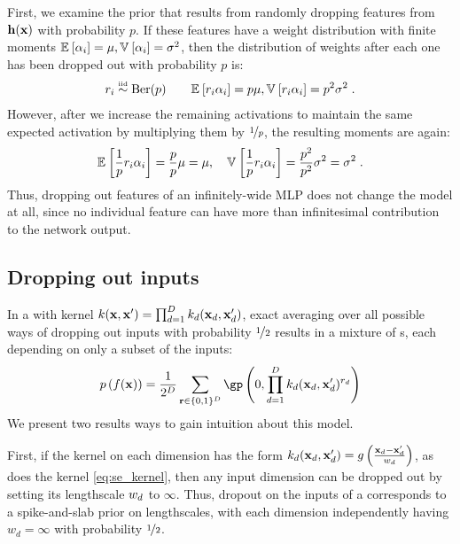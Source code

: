 First, we examine the prior that results from randomly dropping features from ${\bf{h}}({\bf{x}})$ with probability $p$.
If these features have a weight distribution with finite moments
$\mathbb{E}_{} \left[ { \alpha_i} \right] = \mu, \mathbb{V}_{} \left[ {\alpha_i} \right] = \sigma^2$,
then the distribution of weights after each one has been dropped out with probability $p$ is:
\begin{align}
r_i \overset{\mbox{\tiny iid}}{\sim} \textnormal{Ber}(p)
\qquad
\mathbb{E}_{} \left[ { r_i \alpha_i} \right] = p\mu, \mathbb{V}_{} \left[ {r_i \alpha_i} \right] = p^2 \sigma^2 \;.
\end{align}
However, after we increase the remaining activations to maintain the same expected activation by multiplying them by $\nicefrac{1}{p}$, the resulting moments are again:
\begin{align}
\mathbb{E}_{} \left[ { \frac{1}{p} r_i \alpha_i } \right] = \frac{p}{p}\mu = \mu, \quad \mathbb{V}_{} \left[ { \frac{1}{p} r_i \alpha_i} \right] = \frac{p^2}{p^2} \sigma^2 = \sigma^2 \;.
\end{align}
Thus, dropping out features of an infinitely-wide MLP does not change the model at all, since no individual feature can have more than infinitesimal contribution to the network output.

\subsection{Dropping out inputs}

In a \gp{} with kernel ${k({\bf{x}}, {\bf{x}}') = \prod_{d=1}^D k_d({\bf{x}}_d, {\bf{x}}_d')}$, exact averaging over all possible ways of dropping out inputs with probability $\nicefrac{1}{2}$ results in a mixture of \gp{}s, each depending on only a subset of the inputs:
\begin{align}
p \left( f(\vx) \right)= \frac{1}{2^D} \sum_{\vr \in \{0,1\}^D}  \textnormal{\gp} \left(0, \prod_{d=1}^D k_d(\vx_d, \vx_d')^{r_d} \right)
\label{eq:dropout-mixture}
\end{align}
We present two results ways to gain intuition about this model.

First, if the kernel on each dimension has the form ${k_d({\bf{x}}_d, {\bf{x}}_d') = g \left( \frac{{\bf{x}}_d - {\bf{x}}_d'}{w_d} \right)}$, as does the  kernel \eqref{eq:se_kernel}, then any input dimension can be dropped out by setting its lengthscale $w_d$ to $\infty$.
Thus, dropout on the inputs of a \gp{} corresponds to a spike-and-slab prior on lengthscales, with each dimension independently having $w_d = \infty$ with probability $\nicefrac{1}{2}$.



